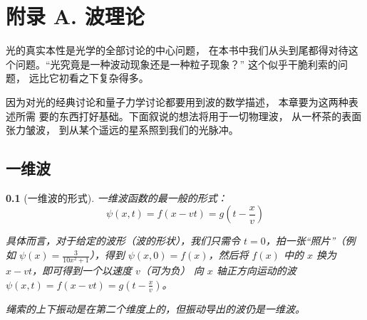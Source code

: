 \documentclass[UTF8]{report}
\theoremstyle{MyLineTheoremStyle} %
\theoremstyle{MyBlockTheoremStyle} %
\theoremstyle{MySubsubsectionStyle} %
\newtheorem{definition}{}
\begin{document}
\nocite{*}

\thispagestyle{fancy} 




\newpage
\appendix
\titleformat{\chapter}[hang]{\normalfont\huge\bfseries\centering}{}{20pt}{}
\titlespacing*{\chapter}{0pt}{-25pt}{8pt} %
\titleformat{\section}[hang]{\normalfont\centering\Large\bfseries}{\thesection}{8pt}{}

\chapter*{附录 A. 波理论}   
\thispagestyle{fancy} 
\setcounter{section}{0}   
\renewcommand\thesection{A.\arabic{section}}   
\renewcommand{\thefigure}{A.\arabic{figure}} 
\renewcommand{\thetable}{A.\arabic{table}}


光的真实本性是光学的全部讨论的中心问题， 在本书中我们从头到尾都得对待这个问题。“光究竟是一种波动现象还是一种粒子现象？” 这个似乎干脆利索的问题， 远比它初看之下复杂得多。

因为对光的经典讨论和量子力学讨论都要用到波的数学描述， 本章要为这两种表述所需
要的东西打好基础。下面叙说的想法将用于一切物理波， 从一杯茶的表面张力皱波， 到从某个遥远的星系照到我们的光脉冲。

\section{一维波}


\begin{definition}[一维波的形式]
一维波函数的最一般的形式：
\begin{equation}
\psi(x,t) = f(x-vt) = g(t - \frac{x}{v})
\end{equation}

具体而言，对于给定的波形（波的形状），我们只需令 $t=0$，拍一张“照片”（例如 $\psi(x) = \frac{3}{10x^2+1}$），得到 $\psi(x,0) = f(x)$，然后将 $f(x)$ 中的 $x$ 换为 $x-vt$，即可得到一个以速度 $v$（可为负） 向 $x$ 轴正方向运动的波 $\psi(x,t) = f(x - vt) = g(t - \frac{x}{v})$。
{\par\color{gray}\small
绳索的上下振动是在第二个维度上的，但振动导出的波仍是一维波。
\par}
\end{definition}
\end{document}
